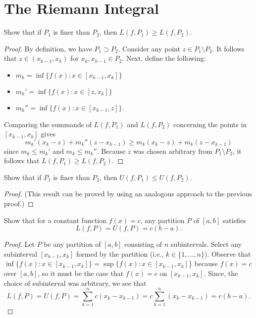\section{The Riemann Integral}

\begin{problem}
  Show that if $P_{1}$ is finer than $P_{2}$, then $L(f, P_{1}) \geq L(f, P_{2})$.

  \begin{proof}
    By definition, we have $P_{1} \supset P_{2}$. Consider any point $z \in P_{1} \setminus P_{2}$.
    It follows that $z \in (x_{k-1}, x_{k})$ for $x_{k}, x_{k-1} \in P_{2}$. Next, define the following:
    \begin{itemize}
      \item $m_{k} = \inf\{f(x) : x \in [x_{k-1}, x_{k}]\}$
      \item $m_{k}' = \inf\{f(x) : x \in [z, x_{k}]\}$
      \item $m_{k}'' = \inf\{f(x) : x \in [x_{k-1}, z]\}$.
    \end{itemize}
    Comparing the summands of $L(f, P_{1})$ and $L(f, P_{2})$ concerning the points in $[x_{k-1}, x_{k}]$ gives
    \[
      m_{k}'(x_{k} - z) + m_{k}''(z - x_{k-1}) \geq m_{k}(x_{k} - z) + m_{k}(z - x_{k-1})
    \]
    since $m_{k} \leq m_{k}'$ and $m_{k} \leq m_{k}''$.
    Because $z$ was chosen arbitrary from $P_{1} \setminus P_{2}$, it follows
    that $L(f, P_{1}) \geq L(f, P_{2})$.
  \end{proof}

\end{problem}

\begin{problem}
  Show that if $P_{1}$ is finer than $P_{2}$, then $U(f, P_{1}) \leq U(f, P_{2})$.
  
  \begin{proof}
    (This result can be proved by using an analogous approach to the previous proof.)
  \end{proof}

\end{problem}

\begin{problem}
  Show that for a constant function $f(x) = c$, any partition $P$ of $[a,b]$ satisfies
  \[
    L(f, P) = U(f, P) = c(b - a).
  \]
  
  \begin{proof}
    Let $P$ be any partition of $[a,b]$ consisting of $n$ subintervals. Select
    any subinterval $[x_{k-1}, x_{k}]$ formed by the partition (i.e., $k \in \{1, \ldots, n \}$).
    Observe that $\inf\{f(x) : x \in [x_{k-1}, x_{k}]\} = \sup\{f(x) : x \in [x_{k-1}, x_{k}]\}$
    because $f(x) = c$ over $[a, b]$, so it must be the case that $f(x) = c$ on $[x_{k-1}, x_{k}]$.
    Since, the choice of subinterval was arbitrary, we see that
    \[
      L(f, P) = U(f, P) = \sum_{k=1}^{n} c(x_{k} - x_{k-1}) = c \sum_{k=1}^{n} (x_{k} - x_{k-1}) = c(b - a).
    \]
  \end{proof}

\end{problem}
